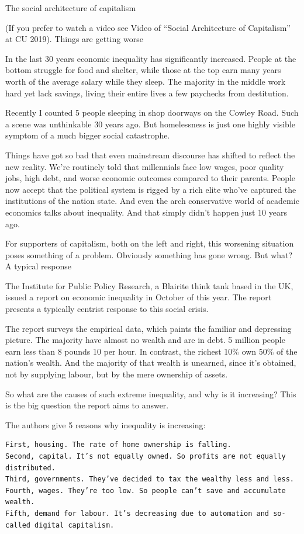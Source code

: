 \documentclass[
]{book}
\begin{document}
The social architecture of capitalism

(If you prefer to watch a video see Video of ``Social Architecture of Capitalism'' at CU 2019).
Things are getting worse

In the last 30 years economic inequality has significantly increased. People at the bottom struggle for food and shelter, while those at the top earn many years worth of the average salary while they sleep. The majority in the middle work hard yet lack savings, living their entire lives a few paychecks from destitution.

Recently I counted 5 people sleeping in shop doorways on the Cowley Road. Such a scene was unthinkable 30 years ago. But homelessness is just one highly visible symptom of a much bigger social catastrophe.

Things have got so bad that even mainstream discourse has shifted to reflect the new reality. We're routinely told that millennials face low wages, poor quality jobs, high debt, and worse economic outcomes compared to their parents. People now accept that the political system is rigged by a rich elite who've captured the institutions of the nation state. And even the arch conservative world of academic economics talks about inequality. And that simply didn't happen just 10 years ago.

For supporters of capitalism, both on the left and right, this worsening situation poses something of a problem. Obviously something has gone wrong. But what?
A typical response

The Institute for Public Policy Research, a Blairite think tank based in the UK, issued a report on economic inequality in October of this year. The report presents a typically centrist response to this social crisis.

The report surveys the empirical data, which paints the familiar and depressing picture. The majority have almost no wealth and are in debt. 5 million people earn less than 8 pounds 10 per hour. In contrast, the richest 10\% own 50\% of the nation's wealth. And the majority of that wealth is unearned, since it's obtained, not by supplying labour, but by the mere ownership of assets.

So what are the causes of such extreme inequality, and why is it increasing? This is the big question the report aims to answer.

The authors give 5 reasons why inequality is increasing:

\begin{verbatim}
First, housing. The rate of home ownership is falling.
Second, capital. It’s not equally owned. So profits are not equally distributed.
Third, governments. They’ve decided to tax the wealthy less and less.
Fourth, wages. They’re too low. So people can’t save and accumulate wealth.
Fifth, demand for labour. It’s decreasing due to automation and so-called digital capitalism.
\end{verbatim}
\end{document}
